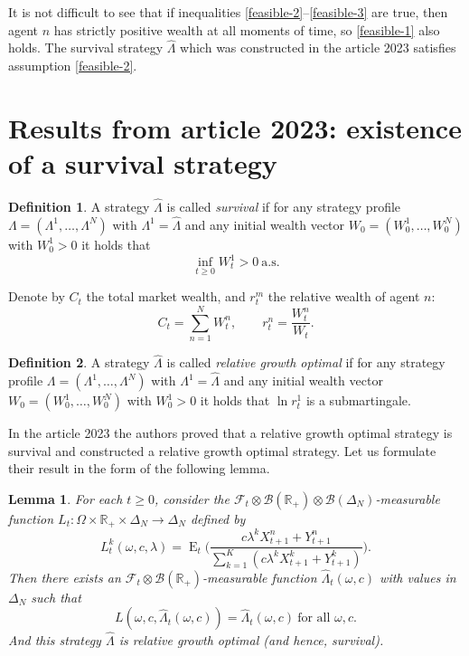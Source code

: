 \documentclass[a4paper,11pt,english]{article}
\newtheorem{lemma}{Lemma}
\theoremstyle{definition}
\newtheorem{definition}{Definition}
\DeclareMathOperator{\E}{E}
\renewcommand{\hat}{\widehat}
\newcommand{\F}{\mathcal{F}}
\newcommand{\R}{\mathbb{R}}
\begin{document}
It is not difficult to see that if inequalities
\eqref{feasible-2}--\eqref{feasible-3} are true, then agent $n$ has 
strictly positive wealth at all moments of time, so \eqref{feasible-1} also
holds. The survival strategy $\hat\Lambda$ which was constructed in the article 2023
satisfies assumption \eqref{feasible-2}.


\section{Results from article 2023: existence of a survival strategy}
\begin{definition}
A strategy $\hat \Lambda$ is called \emph{survival} if for any strategy profile
$\Lambda = (\Lambda^{1},\ldots,\Lambda^N)$ with $\Lambda^1 = \hat \Lambda$ and any
initial wealth vector $W_0=(W_0^1,\ldots,W_0^N)$ with $W_0^1 > 0$ it holds that
\[
\inf_{t\ge 0} W_t^1 > 0\ \text{a.s.}
\]
\end{definition}

Denote by $C_t$ the total market wealth, and $r_t^m$ the relative wealth of agent $n$:
\[
C_t = \sum_{n=1}^N W_t^n, \qquad r_t^n = \frac{W_t^n}{W_t}.
\]

\begin{definition}
A strategy $\hat \Lambda$ is called \emph{relative growth optimal} if for any strategy profile
$\Lambda = (\Lambda^{1},\ldots,\Lambda^N)$ with $\Lambda^1 = \hat \Lambda$ and any
initial wealth vector $W_0=(W_0^1,\ldots,W_0^N)$ with $W_0^1 > 0$ it holds that $\ln r_t^1$ is a submartingale.
\end{definition}

In the article 2023 the authors proved that a relative growth optimal strategy is survival and constructed a relative growth optimal strategy. Let us formulate their result in the form of the following lemma.


\begin{lemma}
\label{lemma1}
For each $t\ge 0$, consider the $\F_t\otimes \mathcal{B}(\R_+)\otimes
\mathcal{B}(\Delta_N)$-measurable function $L_t \colon \Omega
\times \R_+ \times \Delta_N \to \Delta_N$ defined by
\[
L_t^k(\omega,c,\lambda) = \E_t\biggl(\frac{c\lambda^k
X_{t+1}^n + Y_{t+1}^n}{\sum_{k=1}^K (c \lambda^k X_{t+1}^k + Y_{t+1}^k)}\biggr).
\]
Then there exists an $\F_t\otimes\mathcal{B}(\R_+)$-measurable function $\hat
\Lambda_t(\omega,c)$ with values in $\Delta_N$ such that
\begin{equation}
L(\omega,c,\hat \Lambda_t(\omega,c)) = \hat \Lambda_t(\omega,c)\
\text{for all $\omega,c$}.\label{lambda-hat}
\end{equation}
And this strategy $\hat \Lambda$ is relative growth optimal (and hence, survival).
\end{lemma}
\end{document}
